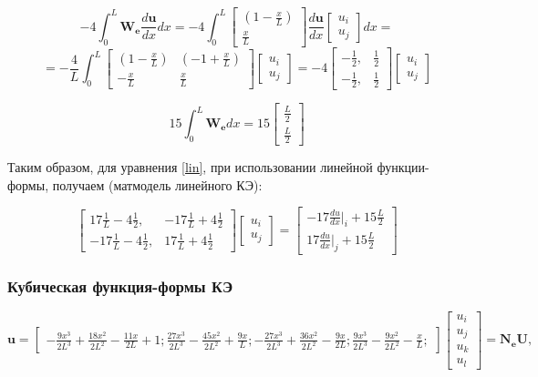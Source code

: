 $$
 -4  \int_0^L \mathbf{W_e} \frac{d \mathbf{u}}{dx} dx= -4  \int_0^L
	\begin{bmatrix}
	(1-\frac{x}{L}) \\
	\frac{x}{L}
	\end{bmatrix}
\frac{d \mathbf{u}}{dx}
	\begin{bmatrix}
	u_i \\
	u_j
	\end{bmatrix}
dx
=
$$
$$
=
-\frac{4}{L}  
\int_0^L
\begin{bmatrix}
	(1-\frac{x}{L}) & (-1+\frac{x}{L})\\
	-\frac{x}{L} & \frac{x}{L}
\end{bmatrix}
\begin{bmatrix}
	u_i \\
	u_j
\end{bmatrix}
=
 -4  
\begin{bmatrix}
-\frac{1}{2}, & \frac{1}{2} \\
-\frac{1}{2}, & \frac{1}{2}
\end{bmatrix}
\begin{bmatrix}
u_i \\
u_j
\end{bmatrix}
$$

$$15\int_0^L \mathbf{W_e} d x= 15
\begin{bmatrix}
	\frac{L}{2} \\
	\frac{L}{2}
\end{bmatrix}
$$

Таким образом, для уравнения \ref{lin}, при использовании линейной функции-формы,  получаем (матмодель линейного КЭ):

$$
\begin{bmatrix}
	17\frac{1}{L}  -4   \frac{1}{2}, &   -17 \frac{1}{L}  +4   \frac{1}{2} \\
	  -17  \frac{1}{L} -4   \frac{1}{2}, &  17\frac{1}{L}  +4   \frac{1}{2}
\end{bmatrix}
\begin{bmatrix}
	u_i \\
	u_j
\end{bmatrix}=
\begin{bmatrix}
	  -17 \frac{du}{dx}|_i   +15  \frac{L}{2}\\
	17\frac{du}{dx}|_j   +15  \frac{L}{2}
\end{bmatrix}
$$


\subsubsection{Кубическая функция-формы КЭ}
$$
\mathbf{u}=\begin{bmatrix}
-\frac{9x^3}{2L^3}+\frac{18x^2}{2L^2}-\frac{11x}{2L} + 1;
\frac{27x^3}{2L^3}-\frac{45x^2}{2L^2}+\frac{9x}{L};
-\frac{27x^3}{2L^3}+\frac{36x^2}{2L^2}-\frac{9x}{2L};
\frac{9x^3}{2L^3}-\frac{9x^2}{2L^2}-\frac{x}{L};
\end{bmatrix}
\begin{bmatrix}
u_i \\
u_j\\
u_k\\
u_l
\end{bmatrix}
=\mathbf{N_eU},
$$

